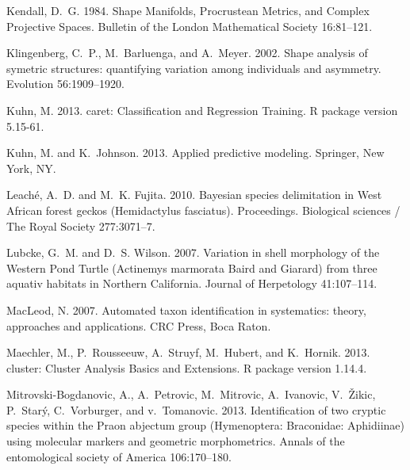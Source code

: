 \documentclass[12pt,letterpaper]{article}
\begin{document}
\begin{thebibliography}{77}
Kendall, D.~G. 1984. {Shape Manifolds, Procrustean Metrics, and Complex
  Projective Spaces}. Bulletin of the London Mathematical Society 16:81--121.

Klingenberg, C.~P., M.~Barluenga, and A.~Meyer. 2002. {Shape analysis of
  symetric structures: quantifying variation among individuals and asymmetry}.
  Evolution 56:1909--1920.

Kuhn, M. 2013. caret: Classification and Regression Training. R package version
  5.15-61.

Kuhn, M. and K.~Johnson. 2013. {Applied predictive modeling}. Springer, New
  York, NY.

Leach\'{e}, A.~D. and M.~K. Fujita. 2010. {Bayesian species delimitation in
  West African forest geckos (Hemidactylus fasciatus).} Proceedings. Biological
  sciences / The Royal Society 277:3071--7.

Lubcke, G.~M. and D.~S. Wilson. 2007. {Variation in shell morphology of the
  Western Pond Turtle (Actinemys marmorata Baird and Giarard) from three
  aquativ habitats in Northern California}. Journal of Herpetology 41:107--114.

MacLeod, N. 2007. {Automated taxon identification in systematics: theory,
  approaches and applications}. CRC Press, Boca Raton.

Maechler, M., P.~Rousseeuw, A.~Struyf, M.~Hubert, and K.~Hornik. 2013. cluster:
  Cluster Analysis Basics and Extensions. R package version 1.14.4.

Mitrovski-Bogdanovic, A., A.~Petrovic, M.~Mitrovic, A.~Ivanovic, V.~\v{Z}ikic,
  P.~Star\'{y}, C.~Vorburger, and v.~Tomanovic. 2013. {Identification of two
  cryptic species within the Praon abjectum group (Hymenoptera: Braconidae:
  Aphidiinae) using molecular markers and geometric morphometrics}. Annals of
  the entomological society of America 106:170--180.


\end{thebibliography}
\end{document}
